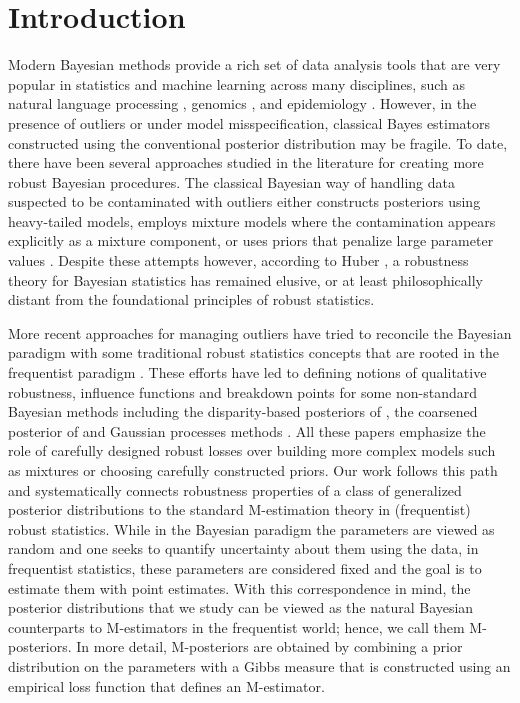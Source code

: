 \documentclass[11pt, oneside]{amsart}
\theoremstyle{definition}   %
\begin{document}
\section{Introduction}
%
Modern Bayesian methods provide a rich set of data analysis tools that are very popular in statistics \citep{gelmanetal2013} and machine learning \citep{bishop2006, murphy::mlbook} across many disciplines, such as natural language processing \citep{blei2003}, genomics \citep{larget1999}, and epidemiology \citep{best2005}.
%
However, in the presence of outliers or under model misspecification, classical Bayes estimators constructed using the conventional posterior distribution may be fragile. To date, there have been several approaches studied in the literature for creating more robust Bayesian procedures. 
%
The classical Bayesian way of handling data suspected to be contaminated with outliers either constructs posteriors using heavy-tailed models, employs mixture models where the contamination appears explicitly as a mixture component, or uses priors that penalize large parameter values \citep{berger1994,andrade:ohagan2006}. Despite these attempts however, according to Huber  \cite[Chapter 15]{huber:ronchetti2009},  a   robustness theory for Bayesian statistics has remained elusive, or at least philosophically distant from the  foundational principles of robust statistics.
%

More recent approaches for managing outliers have tried to reconcile the Bayesian paradigm with some traditional robust statistics concepts that are rooted in the frequentist paradigm \citep{huber1981,huber:ronchetti2009,hampeletal1986,maronnaetal2019}. These efforts have led to defining notions of qualitative robustness, influence functions and breakdown points for some non-standard Bayesian methods including the disparity-based posteriors of \citep{hooker:vidyashankar2014, ghosh:basu2016,matsubara:knoblauch:briol:oates2022}, the coarsened posterior of \cite{miller:dunson2019} and Gaussian processes methods \citep{altamirano:briol:knoblauch2023}. All these papers emphasize the role of carefully designed robust losses over building  more complex models such as mixtures or choosing carefully constructed priors.
%
Our work follows this path and systematically connects robustness properties of a class of generalized posterior distributions to the standard M-estimation theory in (frequentist) robust statistics. While in the Bayesian paradigm the parameters are viewed as random and one seeks to quantify uncertainty about them using the data, in frequentist statistics, these parameters are considered fixed and the goal is to estimate them with point estimates. With this correspondence in mind, the posterior distributions that we study can be viewed as the natural Bayesian counterparts to M-estimators in the frequentist world; hence, we call them M-posteriors. In more detail, M-posteriors are obtained by combining a prior distribution on the parameters with a Gibbs measure that is constructed using an empirical loss function that defines an M-estimator.
\end{document}
